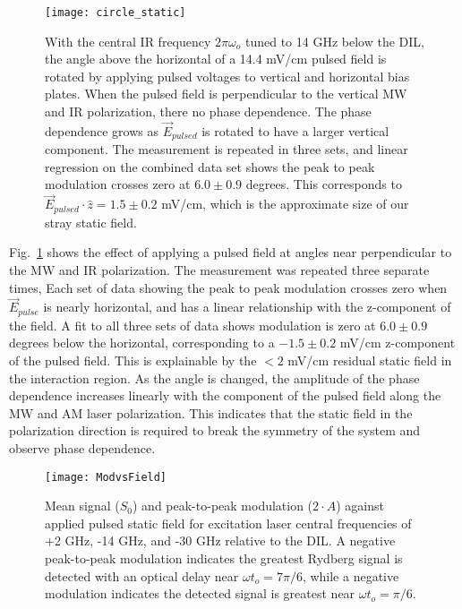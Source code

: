 \documentclass[aps,pra,preprint,groupedaddress]{revtex4-1}
\begin{document}

\begin{figure}
	\texttt{[image: circle\_static]}
	\caption{With the central IR frequency $2\pi\omega_o$ tuned to 14 GHz below the DIL, the angle above the horizontal of a 14.4 mV/cm pulsed field is rotated by applying pulsed voltages to vertical and horizontal bias plates. When the pulsed field is perpendicular to the vertical MW and IR polarization, there no phase dependence. The phase dependence grows as $\vec{E}_{pulsed}$ is rotated to have a larger vertical component. The measurement is repeated in three sets, and linear regression on the combined data set shows the peak to peak modulation crosses zero at $6.0 \pm 0.9$ degrees. This corresponds to $\vec{E}_{pulsed} \cdot \hat{z} = 1.5 \pm 0.2$ mV/cm, which is the approximate size of our stray static field.}
	\label{fig:CircleStatic}
\end{figure}

Fig.~\ref{fig:CircleStatic} shows the effect of applying a pulsed field at angles near perpendicular to the MW and IR polarization. The measurement was repeated three separate times, Each set of data showing the peak to peak modulation crosses zero when $\vec{E}_{pulse}$ is nearly horizontal, and has a linear relationship with the z-component of the field. A fit to all three sets of data shows modulation is zero at $6.0 \pm 0.9$ degrees below the horizontal, corresponding to a $-1.5 \pm 0.2$ mV/cm z-component of the pulsed field. This is explainable by the $<2$ mV/cm residual static field in the interaction region. As the angle is changed, the amplitude of the phase dependence increases linearly with the component of the pulsed field along the MW and AM laser polarization. This indicates that the static field in the polarization direction is required to break the symmetry of the system and observe phase dependence.

\begin{figure}
	\texttt{[image: ModvsField]}
	\caption{Mean signal ($S_0$) and peak-to-peak modulation ($2\cdot A$) against applied pulsed static field for excitation laser central frequencies of +2 GHz, -14 GHz, and -30 GHz relative to the DIL. A negative peak-to-peak modulation indicates the greatest Rydberg signal is detected with an optical delay near $\omega t_o = 7\pi/6$, while a negative modulation indicates the detected signal is greatest near $\omega t_o = \pi/6$.}
	\label{fig:ModvsField}
\end{figure}
\end{document}
